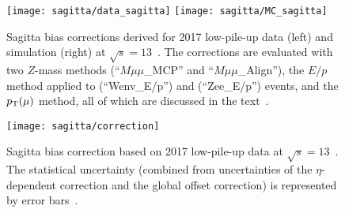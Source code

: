 	
    \begin{figure}[p]
    	\begin{center}
    		\texttt{[image: sagitta/data\_sagitta]}
    		\texttt{[image: sagitta/MC\_sagitta]}
    		\caption{Sagitta bias corrections derived for 2017 low-pile-up data (left)
    			and simulation (right) at $\sqrt{s} = 13$~\TeV. The
    			corrections are evaluated with two $Z$-mass methods
    			(``$M\mu\mu$\_MCP'' and ``$M\mu\mu$\_Align''),
    			the $E/p$ method applied to \Wenu (``Wenv\_E/p'') and \Zee (``Zee\_E/p'')
    			events, and the $p_{\text{T}}(\mu)$ method, all of which are discussed in the text~\cite{int_note_muons}.}
    		\label{fig:allsagitta}
    	\end{center}
    \end{figure}
	

\begin{figure}[htb!]
	\begin{center}
		\texttt{[image: sagitta/correction]}
		\caption{Sagitta bias correction based on 2017 low-pile-up
			data at $\sqrt{s} = 13$~\TeV. The statistical
			uncertainty (combined from uncertainties of the
			$\eta$-dependent correction and the global offset
			correction) is represented by error bars~\cite{int_note_muons}.}
		\label{fig:sagittacorrection}
	\end{center}
\end{figure}
\clearpage

